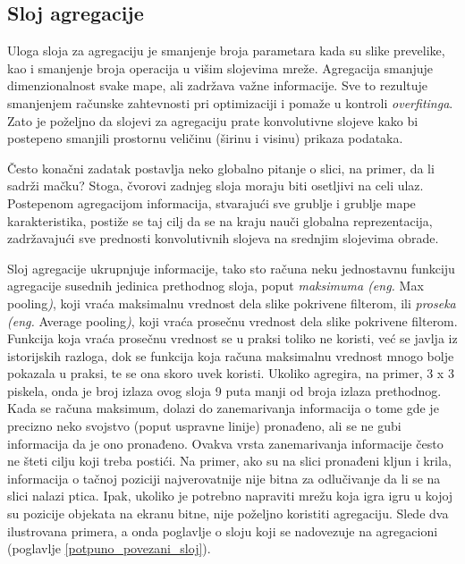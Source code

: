 \documentclass[a4paper]{article}
\begin{document}
\newpage


\subsection{Sloj agregacije}
\label{sloj_agregacije}

Uloga sloja za agregaciju je smanjenje broja parametara kada su slike prevelike, kao i smanjenje broja operacija u višim slojevima mreže. Agregacija smanjuje dimenzionalnost svake mape, ali zadržava važne informacije. Sve to rezultuje smanjenjem računske zahtevnosti pri optimizaciji i pomaže u kontroli \textit{overfitinga}. Zato je poželjno da slojevi za agregaciju prate konvolutivne slojeve kako bi postepeno smanjili prostornu veličinu (širinu i visinu) prikaza podataka.

Često konačni zadatak postavlja neko globalno pitanje o slici, na primer, da li sadrži mačku? Stoga, čvorovi zadnjeg sloja moraju biti osetljivi na celi ulaz. Postepenom agregacijom informacija, stvarajući sve grublje i grublje mape karakteristika, postiže se taj cilj da se na kraju nauči globalna reprezentacija, zadržavajući sve prednosti konvolutivnih slojeva na srednjim slojevima obrade.

Sloj agregacije ukrupnjuje informacije, tako sto računa neku jednostavnu funkciju agregacije susednih jedinica prethodnog sloja, poput \textit{maksimuma (eng.} Max pooling\textit{)}, koji vraća maksimalnu vrednost dela slike pokrivene filterom, ili \textit{proseka (eng.} Average pooling\textit{)}, koji vraća prosečnu vrednost dela slike pokrivene filterom. Funkcija koja vraća prosečnu vrednost se u praksi toliko ne koristi, već se javlja iz istorijskih razloga, dok se funkcija koja računa maksimalnu vrednost mnogo bolje pokazala u praksi, te se ona skoro uvek koristi. Ukoliko agregira, na primer, 3 x 3 piskela, onda je broj izlaza ovog sloja 9 puta manji od broja izlaza prethodnog. Kada se računa maksimum, dolazi do zanemarivanja informacija o tome gde je precizno neko svojstvo (poput uspravne linije) pronađeno, ali se ne gubi informacija da je ono pronađeno. Ovakva vrsta zanemarivanja informacije često ne šteti cilju koji treba postići. Na primer, ako su na slici pronađeni kljun i krila, informacija o tačnoj poziciji najverovatnije nije bitna za odlučivanje da li se na slici nalazi ptica. Ipak, ukoliko je potrebno napraviti mrežu koja igra igru u kojoj su pozicije objekata na ekranu bitne, nije poželjno koristiti agregaciju. Slede dva ilustrovana primera, a onda poglavlje o sloju koji se nadovezuje na agregacioni (poglavlje \ref{potpuno_povezani_sloj}).
\end{document}
